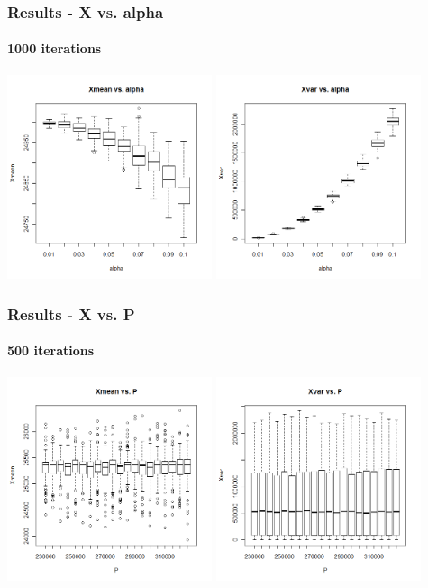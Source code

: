 \begin{frame}
    \frametitle{Results - X vs. alpha }
	\framesubtitle{1000 iterations}
\hspace*{-5mm}
\includegraphics[height=6cm]{boxplot1000_xmean_alpha}
\includegraphics[height=6cm]{boxplot1000_xvar_alpha}
\end{frame}





\begin{frame}
    \frametitle{Results - X vs. P }
	\framesubtitle{500 iterations}
\hspace*{-5mm}
\includegraphics[height=6cm]{boxplot500_xmean_P}
\includegraphics[height=6cm]{boxplot500_xvar_P}
\end{frame}

